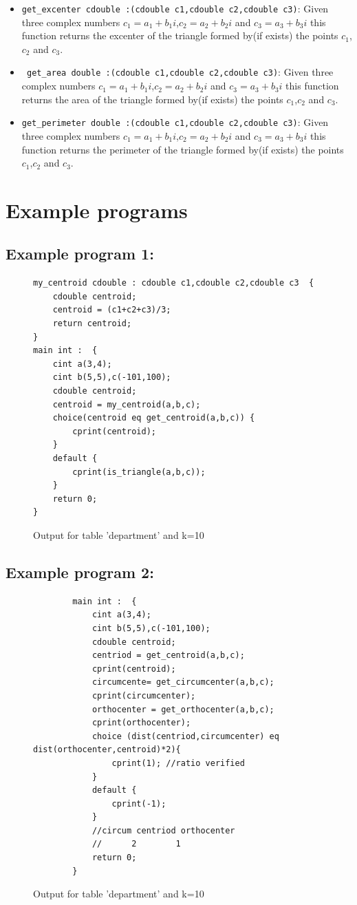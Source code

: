 \documentclass[12pt]{article}
\begin{document}
\begin{itemize}
    \item \texttt{get\_excenter cdouble :(cdouble c1,cdouble c2,cdouble c3)}: Given three complex numbers $c_1=a_1+b_1i$,$c_2=a_2+b_2i$ and $c_3=a_3+b_3i$ this function returns the excenter of the triangle formed by(if exists) the points $c_1$,$c_2$ and $c_3$.
    \item \texttt{ get\_area double :(cdouble c1,cdouble c2,cdouble c3)}: Given three complex numbers $c_1=a_1+b_1i$,$c_2=a_2+b_2i$ and $c_3=a_3+b_3i$ this function returns the area of the triangle formed by(if exists) the points $c_1$,$c_2$ and $c_3$.
    \item \texttt{get\_perimeter double :(cdouble c1,cdouble c2,cdouble c3)}: Given three complex numbers $c_1=a_1+b_1i$,$c_2=a_2+b_2i$ and $c_3=a_3+b_3i$ this function returns the perimeter of the triangle formed by(if exists) the points $c_1$,$c_2$ and $c_3$.
\end{itemize}
\section{Example programs}
\subsection{Example program 1:}
\begin{figure}[H]
    \label{ex_program_1}
    \centering
    \begin{BVerbatim}
my_centroid cdouble : cdouble c1,cdouble c2,cdouble c3  {
    cdouble centroid;
    centroid = (c1+c2+c3)/3;
    return centroid;
}
main int :  {
    cint a(3,4);
    cint b(5,5),c(-101,100);
    cdouble centroid;
    centroid = my_centroid(a,b,c);
    choice(centroid eq get_centroid(a,b,c)) {
        cprint(centroid);
    } 
    default {
        cprint(is_triangle(a,b,c));
    }
    return 0;
}
    \end{BVerbatim}
    \caption{Output for table 'department' and k=10}
    \end{figure}
\subsection{Example program 2:}
\begin{figure}[H]
    \label{ex_program_2}
    \centering
    \begin{BVerbatim}
        main int :  {
            cint a(3,4);
            cint b(5,5),c(-101,100);
            cdouble centroid;
            centriod = get_centroid(a,b,c);
            cprint(centroid);
            circumcente= get_circumcenter(a,b,c);
            cprint(circumcenter);
            orthocenter = get_orthocenter(a,b,c);
            cprint(orthocenter);
            choice (dist(centriod,circumcenter) eq dist(orthocenter,centroid)*2){
                cprint(1); //ratio verified
            }
            default {
                cprint(-1);
            }
            //circum centriod orthocenter
            //      2        1
            return 0;
        }
            \end{BVerbatim}
    \caption{Output for table 'department' and k=10}
    \end{figure}
\end{document}
